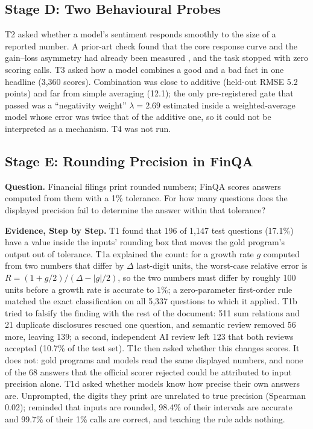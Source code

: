 \documentclass[11pt]{article}
\begin{document}
\subsection{Stage D: Two Behavioural Probes}

T2 asked whether a model's sentiment responds smoothly to the size of a reported number. A prior-art check found that the core response curve and the gain--loss asymmetry had already been measured \citep{marks2026psychophysics}, and the task stopped with zero scoring calls. T3 asked how a model combines a good and a bad fact in one headline (3,360 scores). Combination was close to additive (held-out RMSE 5.2 points) and far from simple averaging (12.1); the only pre-registered gate that passed was a ``negativity weight'' $\lambda=2.69$ estimated inside a weighted-average model whose error was twice that of the additive one, so it could not be interpreted as a mechanism. T4 was not run.

\subsection{Stage E: Rounding Precision in FinQA}

\textbf{Question.} Financial filings print rounded numbers; FinQA \citep{chen-etal-2021-finqa} scores answers computed from them with a 1\% tolerance. For how many questions does the displayed precision fail to determine the answer within that tolerance?

\textbf{Evidence, Step by Step.} T1 found that 196 of 1,147 test questions (17.1\%) have a value inside the inputs' rounding box that moves the gold program's output out of tolerance. T1a explained the count: for a growth rate $g$ computed from two numbers that differ by $\Delta$ last-digit units, the worst-case relative error is $R=(1+g/2)/(\Delta-|g|/2)$, so the two numbers must differ by roughly 100 units before a growth rate is accurate to 1\%; a zero-parameter first-order rule matched the exact classification on all 5,337 questions to which it applied. T1b tried to falsify the finding with the rest of the document: 511 sum relations and 21 duplicate disclosures rescued one question, and semantic review removed 56 more, leaving 139; a second, independent AI review left 123 that both reviews accepted (10.7\% of the test set). T1c then asked whether this changes scores. It does not: gold programs and models read the same displayed numbers, and none of the 68 answers that the official scorer rejected could be attributed to input precision alone. T1d asked whether models know how precise their own answers are. Unprompted, the digits they print are unrelated to true precision (Spearman 0.02); reminded that inputs are rounded, 98.4\% of their intervals are accurate and 99.7\% of their 1\% calls are correct, and teaching the rule adds nothing.
\end{document}
